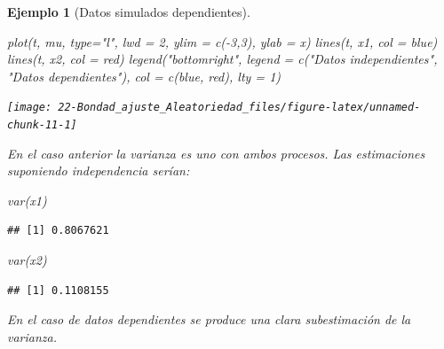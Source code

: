 \documentclass[
]{book}
\newenvironment{Shaded}{\begin{snugshade}}{\end{snugshade}}
\newcommand{\AttributeTok}[1]{\textcolor[rgb]{0.77,0.63,0.00}{#1}}
\newcommand{\DecValTok}[1]{\textcolor[rgb]{0.00,0.00,0.81}{#1}}
\newcommand{\FunctionTok}[1]{\textcolor[rgb]{0.00,0.00,0.00}{#1}}
\newcommand{\NormalTok}[1]{#1}
\newcommand{\SpecialCharTok}[1]{\textcolor[rgb]{0.00,0.00,0.00}{#1}}
\newcommand{\StringTok}[1]{\textcolor[rgb]{0.31,0.60,0.02}{#1}}
\theoremstyle{break}
\newtheorem{example}{Ejemplo}[chapter]
\theoremstyle{nonumberplain}
\begin{document}
\begin{example}[Datos simulados dependientes]
\begin{Shaded}
\begin{Highlighting}[]
\FunctionTok{plot}\NormalTok{(t, mu, }\AttributeTok{type=}\StringTok{"l"}\NormalTok{, }\AttributeTok{lwd =} \DecValTok{2}\NormalTok{, }\AttributeTok{ylim =} \FunctionTok{c}\NormalTok{(}\SpecialCharTok{{-}}\DecValTok{3}\NormalTok{,}\DecValTok{3}\NormalTok{), }\AttributeTok{ylab =} \StringTok{\textquotesingle{}x\textquotesingle{}}\NormalTok{)}
\FunctionTok{lines}\NormalTok{(t, x1, }\AttributeTok{col =} \StringTok{\textquotesingle{}blue\textquotesingle{}}\NormalTok{)}
\FunctionTok{lines}\NormalTok{(t, x2, }\AttributeTok{col =} \StringTok{\textquotesingle{}red\textquotesingle{}}\NormalTok{)}
\FunctionTok{legend}\NormalTok{(}\StringTok{"bottomright"}\NormalTok{, }\AttributeTok{legend =} \FunctionTok{c}\NormalTok{(}\StringTok{"Datos independientes"}\NormalTok{, }\StringTok{"Datos dependientes"}\NormalTok{), }\AttributeTok{col =} \FunctionTok{c}\NormalTok{(}\StringTok{\textquotesingle{}blue\textquotesingle{}}\NormalTok{, }\StringTok{\textquotesingle{}red\textquotesingle{}}\NormalTok{), }\AttributeTok{lty =} \DecValTok{1}\NormalTok{)}
\end{Highlighting}
\end{Shaded}

\begin{center}\texttt{[image: 22-Bondad\_ajuste\_Aleatoriedad\_files/figure-latex/unnamed-chunk-11-1]} \end{center}

En el caso anterior la varianza es uno con ambos procesos.
Las estimaciones suponiendo independencia serían:

\begin{Shaded}
\begin{Highlighting}[]
\FunctionTok{var}\NormalTok{(x1)}
\end{Highlighting}
\end{Shaded}

\begin{verbatim}
## [1] 0.8067621
\end{verbatim}

\begin{Shaded}
\begin{Highlighting}[]
\FunctionTok{var}\NormalTok{(x2)}
\end{Highlighting}
\end{Shaded}

\begin{verbatim}
## [1] 0.1108155
\end{verbatim}

En el caso de datos dependientes se produce una clara subestimación de la varianza.
\end{example}
\end{document}
